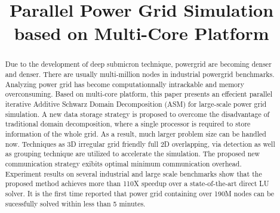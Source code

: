 \documentclass{sig-alternate}
\begin{document}
\title{Parallel Power Grid Simulation based on Multi-Core Platform}

\maketitle

\begin{abstract}
	Due to the development of deep submicron technique, powergrid are becoming denser and denser. There are usually 
	multi-million nodes in industrial powergrid benchmarks. Analyzing power grid has become computationnally 
	intrackable and memory overconsuming. Based on multi-core platform, this paper presents an effecient parallel iterative 
	Additive Schwarz Domain Decomposition (ASM) for large-scale power grid simulation. A new data storage strategy is proposed 
	to overcome
	the disadvantage of traditional domain decomposition, where a single processor is required to store information of the whole grid.
	As a result, much larger problem size can be handled now. Techniques as 3D irregular grid friendly full 2D 
	overlapping, via detection as well as grouping technique are utilized to accelerate the simulation. The proposed new
	communication strategy exibits optimal minimum communication overhead. Experiment results on several industrial and large 
	scale benchmarks show that the proposed method 
	achieves more than 110X speedup over a state-of-the-art direct LU solver. It is the first time 
	reported that power grid containing over 190M nodes can be sucessfully solved within less than 5 minutes.
\end{abstract}
\end{document}
